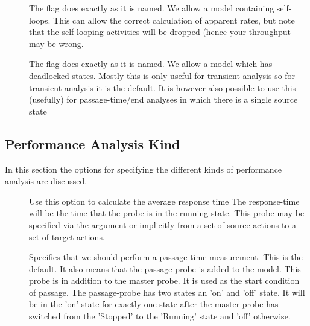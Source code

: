 \begin{description}
\item[ ]
The flag  does exactly as it
is named. We allow a model containing self-loops.
This can allow the correct calculation of apparent
rates, but note that the self-looping activities
will be dropped (hence your throughput may be wrong.

\end{description}

\begin{description}
\item[ ]
The flag  does exactly as it
is named. We allow a model which has deadlocked states.
Mostly this is only useful for transient analysis so for
transient analysis it is the default. It is however also
possible to use this (usefully) for passage-time/end
analyses in which there is a single source state

\end{description}


\subsection{Performance Analysis Kind}
In this section the options for specifying the
different kinds of performance analysis are discussed.

\begin{description}
\item[ ]
Use this option to calculate the average response time
The response-time will be the time that the probe is
in the running state. This probe may be specified via
the  argument or implicitly from a set
of source actions to a set of target actions.

\end{description}

\begin{description}
\item[ ]
Specifies that we should perform a passage-time measurement.
This is the default. It also means that the passage-probe
is added to the model. This probe is in addition to the
master probe. It is used as the start condition of passage.
The passage-probe has two states an 'on' and 'off' state.
It will be in the 'on' state for exactly one state after the
master-probe has switched from the 'Stopped' to the 'Running'
state and 'off' otherwise.

\end{description}

